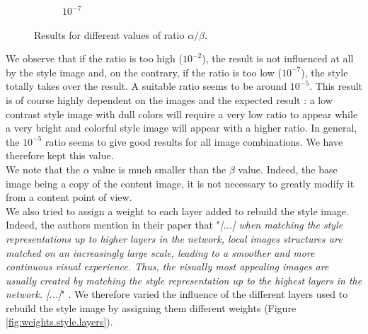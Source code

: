 \documentclass[twocolumn,superscriptaddress,aps, floatfix]{revtex4-1}
\begin{document}
\begin{figure}[ht]
\begin{subfigure}[b]{0.13\textwidth}
            \caption{$10^{-7}$}
        \end{subfigure}
        \caption{Results for different values of ratio $\alpha/\beta$.}
        \label{fig:weights.ratio}
    \end{figure}
    
    We observe that if the ratio is too high ($10^{-2}$), the result is not influenced at all by the style image and, on the contrary, if the ratio is too low ($10^{-7}$), the style totally takes over the result. A suitable ratio seems to be around $10^{-5}$. This result is of course highly dependent on the images and the expected result : a low contrast style image with dull colors will require a very low ratio to appear while a very bright and colorful style image will appear with a higher ratio. In general, the $10^{-5}$ ratio seems to give good results for all image combinations. We have therefore kept this value.\\
    
    We note that the $\alpha$ value is much smaller than the $\beta$ value. Indeed, the base image being a copy of the content image, it is not necessary to greatly modify it from a content point of view.\\
    
    We also tried to assign a weight to each layer added to rebuild the style image. Indeed, the authors mention in their paper that "\emph{[...] when matching the style representations up to higher layers in the network, local images structures are matched on an increasingly large scale, leading to a smoother and more continuous visual experience. Thus, the visually most appealing images are usually created by matching the style representation up to the highest layers in the network. [...]}" \cite{DBLP:journals/corr/GatysEB15a}. We therefore varied the influence of the different layers used to rebuild the style image by assigning them different weights (Figure \ref{fig:weights.style.layers}).
\end{document}

